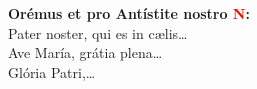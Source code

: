 \textbf{Orémus et pro Antístite nostro \textcolor{red}{N}:}\\
Pater noster, qui es in c{\ae}lis\ldots\\
Ave María, grátia plena\ldots\\
Glória Patri,\ldots